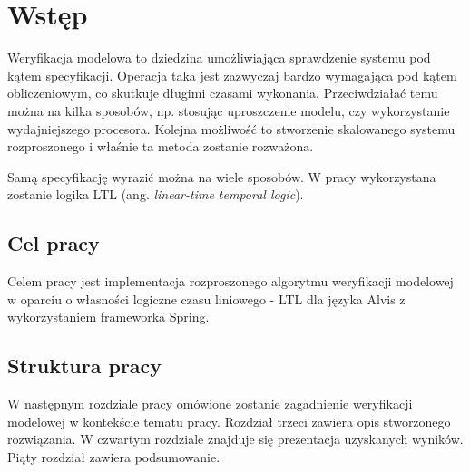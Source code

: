 \chapter{Wstęp}

Weryfikacja modelowa to dziedzina umożliwiająca sprawdzenie systemu pod kątem specyfikacji.
Operacja taka jest zazwyczaj bardzo wymagająca pod kątem obliczeniowym, co skutkuje długimi czasami wykonania. Przeciwdziałać temu można na kilka sposobów, np. stosując uproszczenie modelu, czy wykorzystanie wydajniejszego procesora. Kolejna możliwość to stworzenie skalowanego systemu rozproszonego i właśnie ta metoda zostanie rozważona.

Samą specyfikację wyrazić można na wiele sposobów. W pracy wykorzystana zostanie logika LTL (ang. \textit{linear-time temporal logic}).


\section{Cel pracy}

Celem pracy jest implementacja rozproszonego algorytmu weryfikacji modelowej w oparciu o własności logiczne czasu liniowego - LTL dla języka Alvis z wykorzystaniem frameworka Spring.


\section{Struktura pracy}

W następnym rozdziale pracy omówione zostanie zagadnienie weryfikacji modelowej w kontekście tematu pracy.
Rozdział trzeci zawiera opis stworzonego rozwiązania.
W czwartym rozdziale znajduje się prezentacja uzyskanych wyników.
Piąty rozdział zawiera podsumowanie.
